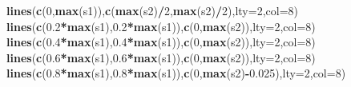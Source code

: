 \documentclass[]{article}
\newenvironment{Shaded}{\begin{snugshade}}{\end{snugshade}}
\newcommand{\DataTypeTok}[1]{\textcolor[rgb]{0.13,0.29,0.53}{#1}}
\newcommand{\DecValTok}[1]{\textcolor[rgb]{0.00,0.00,0.81}{#1}}
\newcommand{\FloatTok}[1]{\textcolor[rgb]{0.00,0.00,0.81}{#1}}
\newcommand{\KeywordTok}[1]{\textcolor[rgb]{0.13,0.29,0.53}{\textbf{#1}}}
\newcommand{\NormalTok}[1]{#1}
\newcommand{\OperatorTok}[1]{\textcolor[rgb]{0.81,0.36,0.00}{\textbf{#1}}}
\begin{document}
\begin{Shaded}
\begin{Highlighting}[]
\KeywordTok{lines}\NormalTok{(}\KeywordTok{c}\NormalTok{(}\DecValTok{0}\NormalTok{,}\KeywordTok{max}\NormalTok{(s1)),}\KeywordTok{c}\NormalTok{(}\KeywordTok{max}\NormalTok{(s2)}\OperatorTok{/}\DecValTok{2}\NormalTok{,}\KeywordTok{max}\NormalTok{(s2)}\OperatorTok{/}\DecValTok{2}\NormalTok{),}\DataTypeTok{lty=}\DecValTok{2}\NormalTok{,}\DataTypeTok{col=}\DecValTok{8}\NormalTok{)}
\KeywordTok{lines}\NormalTok{(}\KeywordTok{c}\NormalTok{(}\FloatTok{0.2}\OperatorTok{*}\KeywordTok{max}\NormalTok{(s1),}\FloatTok{0.2}\OperatorTok{*}\KeywordTok{max}\NormalTok{(s1)),}\KeywordTok{c}\NormalTok{(}\DecValTok{0}\NormalTok{,}\KeywordTok{max}\NormalTok{(s2)),}\DataTypeTok{lty=}\DecValTok{2}\NormalTok{,}\DataTypeTok{col=}\DecValTok{8}\NormalTok{)}
\KeywordTok{lines}\NormalTok{(}\KeywordTok{c}\NormalTok{(}\FloatTok{0.4}\OperatorTok{*}\KeywordTok{max}\NormalTok{(s1),}\FloatTok{0.4}\OperatorTok{*}\KeywordTok{max}\NormalTok{(s1)),}\KeywordTok{c}\NormalTok{(}\DecValTok{0}\NormalTok{,}\KeywordTok{max}\NormalTok{(s2)),}\DataTypeTok{lty=}\DecValTok{2}\NormalTok{,}\DataTypeTok{col=}\DecValTok{8}\NormalTok{)}
\KeywordTok{lines}\NormalTok{(}\KeywordTok{c}\NormalTok{(}\FloatTok{0.6}\OperatorTok{*}\KeywordTok{max}\NormalTok{(s1),}\FloatTok{0.6}\OperatorTok{*}\KeywordTok{max}\NormalTok{(s1)),}\KeywordTok{c}\NormalTok{(}\DecValTok{0}\NormalTok{,}\KeywordTok{max}\NormalTok{(s2)),}\DataTypeTok{lty=}\DecValTok{2}\NormalTok{,}\DataTypeTok{col=}\DecValTok{8}\NormalTok{)}
\KeywordTok{lines}\NormalTok{(}\KeywordTok{c}\NormalTok{(}\FloatTok{0.8}\OperatorTok{*}\KeywordTok{max}\NormalTok{(s1),}\FloatTok{0.8}\OperatorTok{*}\KeywordTok{max}\NormalTok{(s1)),}\KeywordTok{c}\NormalTok{(}\DecValTok{0}\NormalTok{,}\KeywordTok{max}\NormalTok{(s2)}\OperatorTok{-}\FloatTok{0.025}\NormalTok{),}\DataTypeTok{lty=}\DecValTok{2}\NormalTok{,}\DataTypeTok{col=}\DecValTok{8}\NormalTok{)}


\end{Highlighting}
\end{Shaded}
\end{document}
